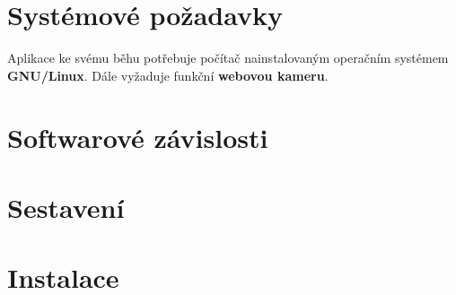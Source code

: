 \section{Systémové požadavky}
Aplikace ke svému běhu potřebuje počítač nainstalovaným operačním systémem
\textbf{GNU/Linux}. Dále vyžaduje funkční \textbf{webovou kameru}. 

\section{Softwarové závislosti}

\section{Sestavení}
\section{Instalace}
